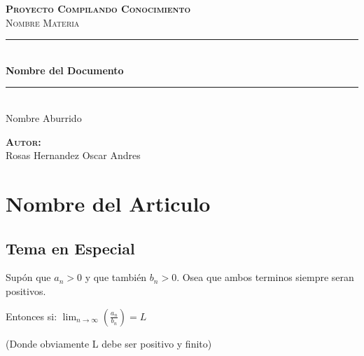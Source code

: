 \documentclass[12pt]{article}                               %
\author{Oscar Andrés Rosas}                                 %
\begin{document}
\begin{titlepage}

    \center
    \textbf{\textsc{\Large Proyecto Compilando Conocimiento}}\\[1.0cm] 
    \textsc{\Large Nombre Materia}\\[1.0cm] 

    \rule{\linewidth}{0.5mm} \\[1.0cm]
        { \huge \bfseries Nombre del Documento}\\[1.0cm] 
    \rule{\linewidth}{0.5mm} \\[2.0cm]
    
    {\LARGE Nombre Aburrido}\\[7cm] 
    
    \begin{center} \large
    \textbf{\textsc{Autor:}}\\
    Rosas Hernandez Oscar Andres
    \end{center}

    \vfill

\end{titlepage}






\section{Nombre del Articulo}

\subsection{Tema en Especial}
Supón que $a _n > 0$ y que también $b_n > 0$. Osea que ambos terminos siempre seran positivos.

Entonces si:
$\lim_{n \to \infty} \left( \frac{a_n}{b_n} \right) = L$

(Donde obviamente L debe ser positivo y finito)
\end{document}
